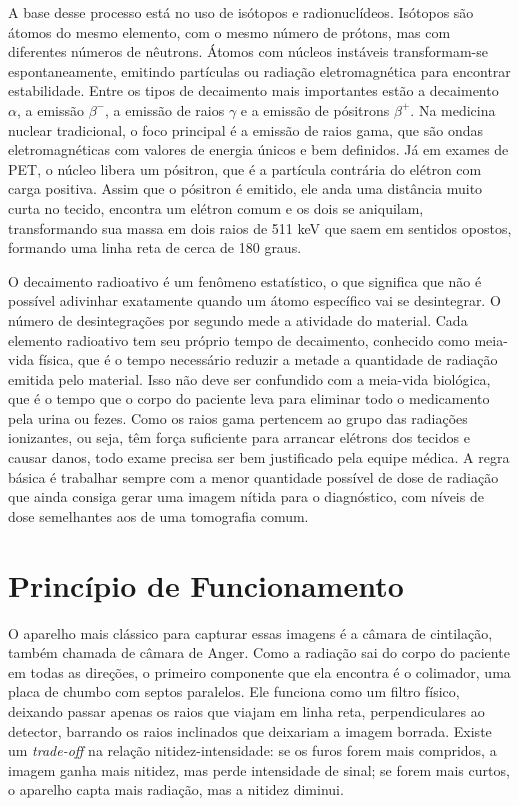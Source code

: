\documentclass[a4paper,12pt,oneside,openright]{abntex2}
\begin{document}
A base desse processo está no uso de isótopos e radionuclídeos. Isótopos são átomos do mesmo elemento, com o mesmo número de prótons, mas com diferentes números de nêutrons. Átomos com núcleos instáveis transformam-se espontaneamente, emitindo partículas ou radiação eletromagnética para encontrar estabilidade. Entre os tipos de decaimento mais importantes estão a decaimento $\alpha$, a emissão $\beta^{-}$, a emissão de raios $\gamma$ e a emissão de pósitrons $\beta^{+}$. Na medicina nuclear tradicional, o foco principal é a emissão de raios gama, que são ondas eletromagnéticas com valores de energia únicos e bem definidos. Já em exames de PET, o núcleo libera um pósitron, que é a partícula contrária do elétron com carga positiva. Assim que o pósitron é emitido, ele anda uma distância muito curta no tecido, encontra um elétron comum e os dois se aniquilam, transformando sua massa em dois raios de 511 keV que saem em sentidos opostos, formando uma linha reta de cerca de 180 graus.

O decaimento radioativo é um fenômeno estatístico, o que significa que não é possível adivinhar exatamente quando um átomo específico vai se desintegrar. O número de desintegrações por segundo mede a atividade do material. Cada elemento radioativo tem seu próprio tempo de decaimento, conhecido como meia-vida física, que é o tempo necessário reduzir a metade a quantidade de radiação emitida pelo material. Isso não deve ser confundido com a meia-vida biológica, que é o tempo que o corpo do paciente leva para eliminar todo o medicamento pela urina ou fezes. Como os raios gama pertencem ao grupo das radiações ionizantes, ou seja, têm força suficiente para arrancar elétrons dos tecidos e causar danos, todo exame precisa ser bem justificado pela equipe médica. A regra básica é trabalhar sempre com a menor quantidade possível de dose de radiação que ainda consiga gerar uma imagem nítida para o diagnóstico, com níveis de dose semelhantes aos de uma tomografia comum.

\section{Princípio de Funcionamento}

O aparelho mais clássico para capturar essas imagens é a câmara de cintilação, também chamada de câmara de Anger. Como a radiação sai do corpo do paciente em todas as direções, o primeiro componente que ela encontra é o colimador, uma placa de chumbo com septos paralelos. Ele funciona como um filtro físico, deixando passar apenas os raios que viajam em linha reta, perpendiculares ao detector, barrando os raios inclinados que deixariam a imagem borrada. Existe um \textit{trade-off} na relação nitidez-intensidade: se os furos forem mais compridos, a imagem ganha mais nitidez, mas perde intensidade de sinal; se forem mais curtos, o aparelho capta mais radiação, mas a nitidez diminui.
\end{document}
